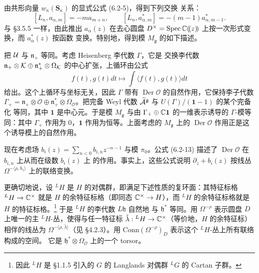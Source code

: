 由共形向量 $w_\kappa(\mathbf S_\kappa)$ 的显式公式 (6.2-5)，得到下列交换
关系：
\[
    [L_n,a_{\alpha,m}]=-ma_{m+n},\qquad
    [L_n,a^*_{\alpha,m}]=-(m-1)a^*_{\alpha,m-1}.
\]
与 \S3.5.5 一样，由此推出 $a_\alpha(z)$ 在去心圆盘
$D^\times=\operatorname{Spec}\mathbb{C}(\!(z)\!)$ 上按一次形式变换，而 $a^*_\alpha(z)$ 按函数
变换。特别地，得到模 $M_{\mathfrak g}$ 的如下描述。

把 $\mathcal{U}$ 与 $\mathfrak n_+$ 等同。考虑 Heisenberg 李代数 $\Gamma$，它是
交换李代数 $\mathfrak n_+\otimes\mathcal{K}\oplus\mathfrak n^*_+\otimes
\Omega_{\mathcal{K}}$ 的中心扩张，上循环由公式
\[
    f(t),g(t)dt\mapsto\int\langle f(t),g(t)\rangle dt
\]
给出。这个上循环与坐标无关，因此 $\Gamma$ 带有
$\operatorname{Der}\mathcal O$ 的自然作用，它保持李子代数
$\Gamma_+=\mathfrak n_+\otimes\mathcal O\oplus\mathfrak n^*_+\otimes
\Omega_{\mathcal O}$。把完备 Weyl 代数
$\widetilde{\mathcal{A}}^{\mathfrak g}$ 与 $U(\Gamma)/(\mathbf 1-1)$ 的某个完备化
等同，其中 $\mathbf 1$ 是中心元。于是模 $M_{\mathfrak g}$ 与由
$\Gamma_+\oplus\mathbb{C}\mathbf 1$ 的一维表示诱导的 $\Gamma$-模等同：其中
$\Gamma_+$ 作用为 $0$，$\mathbf 1$ 作用为恒等。上面考虑的 $M_{\mathfrak g}$
上的 $\operatorname{Der}\mathcal O$ 作用正是这个诱导模上的自然作用。

现在考虑场 $b_i(z)=\sum_{n<0}b_{i,n}z^{-n-1}$ 与模 $\pi_0$。公式 (6.2-13)
描述了 $\operatorname{Der}\mathcal O$ 在 $b_{i,n}$ 上从而在级数 $b_i(z)$ 上
的作用。事实上，这些公式说明 $\partial_z+b_i(z)$ 按线丛
$\Omega^{-\langle\rho,h_i\rangle}$ 上的联络变换。

更确切地说，设 $^LH$ 是 $H$ 的对偶群，即满足下述性质的复环面：其特征标格
$^LH\to\mathbb{C}^\times$ 就是 $H$ 的余特征标格（即同态 $\mathbb{C}^\times\to H$），而
$^LH$ 的余特征标格就是 $H$ 的特征标格。\footnote{因此 $^LH$ 是 \S1.1.5 引入的 $G$ 的 Langlands
对偶群 $^LG$ 的 Cartan 子群。} 于是 $^LH$ 的李代数 $L\mathfrak h$ 自然地
与 $\mathfrak h^*$ 等同。用 $\Omega^{-\rho}$ 表示圆盘 $D$ 上唯一的主
$^LH$-丛，使得与任一特征标 $\check\lambda:{}^LH\to\mathbb{C}^\times$（等价地，$H$
的余特征标）相伴的线丛为
$\Omega^{-\langle\rho,\check\lambda\rangle}$（见 \S4.2.3）。用
$\mathrm{Conn}(\Omega^{-\rho})_D$ 表示这个 $^LH$-丛上所有联络构成的空间。
它是 $\mathfrak h^*\otimes\Omega_{\mathcal O}$ 上的一个 torsor。


